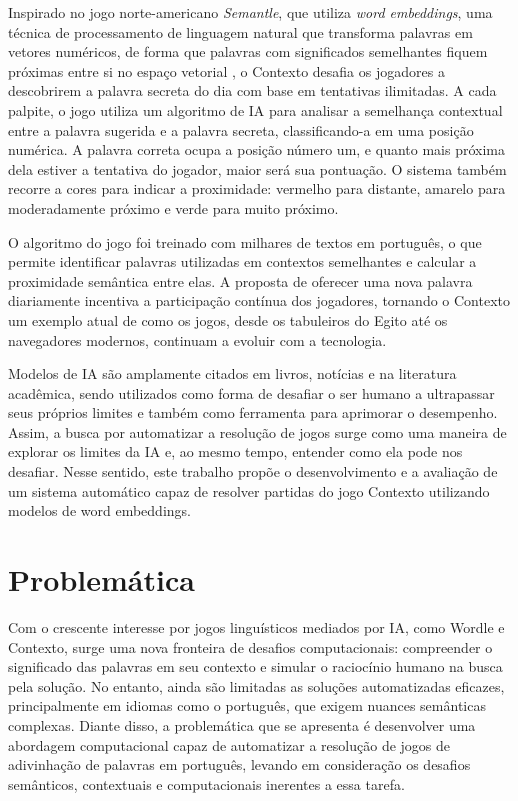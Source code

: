 Inspirado no jogo norte-americano \textit{Semantle}, que utiliza \textit{word embeddings}, uma técnica de processamento de linguagem natural que transforma palavras em vetores numéricos, de forma que palavras com significados semelhantes fiquem próximas entre si no espaço vetorial \cite{mikolov2013efficient}, o Contexto desafia os jogadores a descobrirem a palavra secreta do dia com base em tentativas ilimitadas. A cada palpite, o jogo utiliza um algoritmo de IA para analisar a semelhança contextual entre a palavra sugerida e a palavra secreta, classificando-a em uma posição numérica. A palavra correta ocupa a posição número um, e quanto mais próxima dela estiver a tentativa do jogador, maior será sua pontuação. O sistema também recorre a cores para indicar a proximidade: vermelho para distante, amarelo para moderadamente próximo e verde para muito próximo.

O algoritmo do jogo foi treinado com milhares de textos em português, o que permite identificar palavras utilizadas em contextos semelhantes e calcular a proximidade semântica entre elas. A proposta de oferecer uma nova palavra diariamente incentiva a participação contínua dos jogadores, tornando o Contexto um exemplo atual de como os jogos, desde os tabuleiros do Egito até os navegadores modernos, continuam a evoluir com a tecnologia.

Modelos de IA são amplamente citados em livros, notícias e na literatura acadêmica, sendo utilizados como forma de desafiar o ser humano a ultrapassar seus próprios limites e também como ferramenta para aprimorar o desempenho. Assim, a busca por automatizar a resolução de jogos surge como uma maneira de explorar os limites da IA e, ao mesmo tempo, entender como ela pode nos desafiar. Nesse sentido, este trabalho propõe o desenvolvimento e a avaliação de um sistema automático capaz de resolver partidas do jogo Contexto utilizando modelos de word embeddings.

\section{Problemática}

Com o crescente interesse por jogos linguísticos mediados por IA, como Wordle e Contexto, surge uma nova fronteira de desafios computacionais: compreender o significado das palavras em seu contexto e simular o raciocínio humano na busca pela solução. No entanto, ainda são limitadas as soluções automatizadas eficazes, principalmente em idiomas como o português, que exigem nuances semânticas complexas. Diante disso, a problemática que se apresenta é desenvolver uma abordagem computacional capaz de automatizar a resolução de jogos de adivinhação de palavras em português, levando em consideração os desafios semânticos, contextuais e computacionais inerentes a essa tarefa. 

